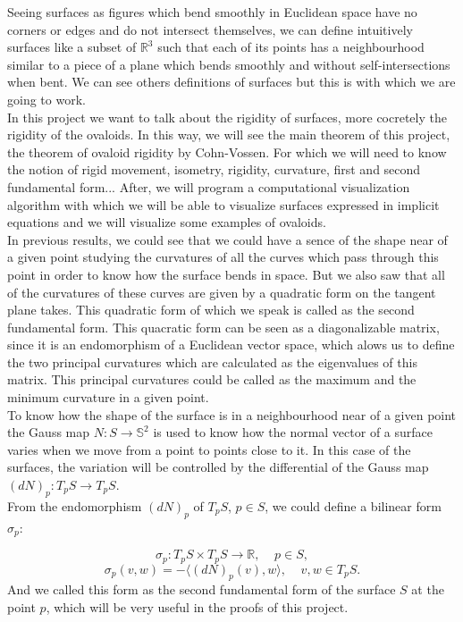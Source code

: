 Seeing surfaces as figures which bend smoothly in Euclidean space have no corners or edges and do not intersect themselves, we can define intuitively surfaces like a subset of $\mathbb{R}^3$ such that each of its points has a neighbourhood similar to a piece of a plane which bends smoothly and without self-intersections when bent. We can see others definitions of surfaces but this is with which we are going to work.
${ }$\\

In this project we want to talk about the rigidity of surfaces, more cocretely the rigidity of the ovaloids. In this way, we will see the main theorem of this project, the theorem of ovaloid rigidity by Cohn-Vossen. For which we will need to know the notion of rigid movement, isometry, rigidity, curvature, first and second fundamental form... After, we will program a computational visualization algorithm with which we will be able to visualize surfaces expressed in implicit equations and we will visualize some examples of ovaloids.
${ }$\\

In previous results, we could see that we could have a sence of the shape near of a given point  studying the curvatures of all the curves which pass through this point in order to know how the surface bends in space. But we also saw that all of the curvatures of these curves are given by a quadratic form on the tangent plane takes. This quadratic form of which we speak is called as the second fundamental form. This quacratic form can be seen as a diagonalizable matrix, since it is an endomorphism of a Euclidean vector space, which alows us to define the two principal curvatures which are calculated as the eigenvalues of this matrix. This principal curvatures could be called as the maximum and the minimum curvature in a given point.
${ }$\\

To know how the shape of the surface is in a neighbourhood near of a given point the Gauss map $N : S \to \mathbb{S}^2$ is used to know how the normal vector of a surface varies when we move from a point to points close to it. In this case of the surfaces, the variation will be controlled by the differential of the Gauss map $(dN)_p : T_p S \to T_p S$.
${ }$\\

From the endomorphism $(dN)_p$ of $T_pS$, $p \in S$, we could define a bilinear form $\sigma_p$:

$$ \sigma_p : T_pS \times T_pS \to \mathbb{R}, \;\;\;\; p \in S, $$
$$ \sigma_p(v,w) = - \langle (dN)_p(v), w \rangle, \;\;\;\; v,w \in T_pS. $$
And we called this form as the second fundamental form of the surface $S$ at the point $p$, which will be very useful in the proofs of this project.
${ }$\\

